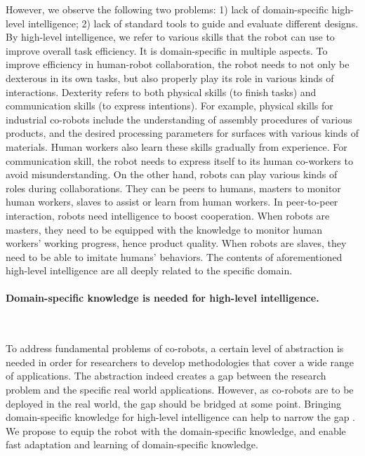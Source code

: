 However, we observe the following two problems: 1) lack of domain-specific high-level intelligence; 2) lack of standard tools to guide and evaluate different designs. By high-level intelligence, we refer to various skills that the robot can use to improve overall task efficiency. It is domain-specific in multiple aspects. To improve efficiency in human-robot collaboration, the robot needs to not only be dexterous in its own tasks, but also properly play its role in various kinds of interactions. Dexterity refers to both physical skills (to finish tasks) and communication skills (to express intentions). For example, physical skills for industrial co-robots include the understanding of assembly procedures of various products, and the desired  processing parameters for surfaces with various kinds of materials. Human workers also learn these skills gradually from experience. For communication skill, the robot needs to express itself to its human co-workers to avoid misunderstanding. On the other hand, robots can play various kinds of roles during collaborations. They can be peers to humans, masters to monitor human workers, slaves to assist or learn from human workers. In peer-to-peer interaction, robots need intelligence to boost cooperation. When robots are masters, they need to be equipped with the knowledge to monitor human workers' working progress, hence product quality. When robots are slaves, they need to be able to imitate humans' behaviors. The contents of aforementioned high-level intelligence are all deeply related to the specific domain. 

\paragraph*{Domain-specific knowledge is needed for high-level intelligence. }~

To address fundamental problems of co-robots, a certain level of abstraction is needed in order for researchers to develop methodologies that cover a wide range of applications. The abstraction indeed creates a gap between the research problem and the specific real world applications.  However, as co-robots are to be deployed in the real world, the gap should be bridged at some point. Bringing domain-specific knowledge for high-level intelligence can help to narrow the gap .    
We propose to equip the robot with the domain-specific knowledge, and enable fast adaptation and learning of domain-specific knowledge. 

